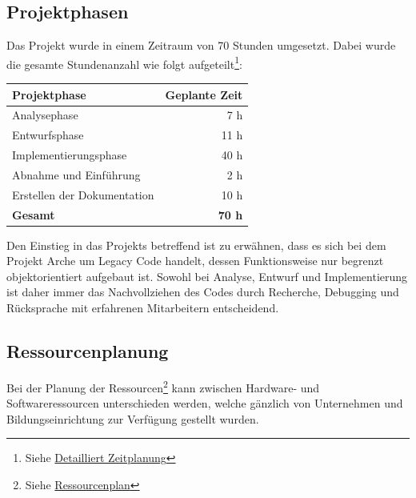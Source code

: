 \documentclass[11pt,toc=sectionentrywithoutdots, 
headheight=44pt, headings=optiontoheadandtoc, hyperfootnotes=false, hypertexnames=false]{scrartcl}
\begin{document}
\subsection{Projektphasen}
Das Projekt wurde in einem Zeitraum von 70 Stunden umgesetzt. Dabei wurde die gesamte Stundenanzahl wie folgt aufgeteilt\footnote{Siehe \hyperref[sec:Detaillierte Zeitplanung]{Detailliert Zeitplanung}}:%

\begin{table}[ht]
	\begin{center}
		\begin{tabular}{ ||l|r|| }
			\hline
			\textbf{Projektphase} 		& \textbf{Geplante Zeit} \\
			\hline

			Analysephase 				& 7 h	 		\\
			Entwurfsphase				& 11 h	 		\\
			Implementierungsphase 		& 40 h	 		\\
			Abnahme und Einführung		& 2 h 			\\
			Erstellen der Dokumentation & 10 h 			\\
			\hline
			\textbf{Gesamt}	 			& \textbf{70 h}	\\
			
			\hline
		\end{tabular}
	\end{center}
\end{table}%

Den Einstieg in das Projekts betreffend ist zu erwähnen, dass es sich bei dem Projekt Arche um \gls{Legacy Code} handelt, dessen Funktionsweise nur begrenzt objektorientiert aufgebaut ist. Sowohl bei Analyse, Entwurf und Implementierung ist daher immer das Nachvollziehen des Codes durch Recherche, Debugging und Rücksprache mit erfahrenen Mitarbeitern entscheidend.

\subsection{Ressourcenplanung}
Bei der Planung der Ressourcen\footnote{Siehe \hyperref[sec:Ressourcenplan]{Ressourcenplan}} kann zwischen Hardware- und Softwareressourcen unterschieden werden, welche gänzlich von Unternehmen und Bildungseinrichtung zur Verfügung gestellt wurden. 
\end{document}
